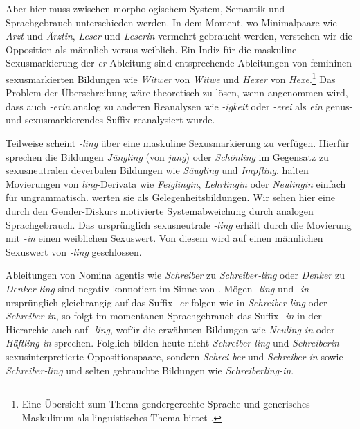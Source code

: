 Aber hier muss zwischen morphologischem System, Semantik und Sprachgebrauch unterschieden werden. In dem Moment, wo Minimalpaare wie \textit{Arzt} und \textit{Ärztin}, \textit{Leser} und \textit{Leserin} vermehrt gebraucht werden, verstehen wir die Opposition als männlich versus weiblich. Ein Indiz für die maskuline Sexusmarkierung der \textit{er}-Ableitung sind entsprechende Ableitungen von femininen sexusmarkierten Bildungen wie \textit{Witwer} von \textit{Witwe} und \textit{Hexer} von \textit{Hexe}.\footnote{Eine Übersicht zum Thema gendergerechte Sprache und generisches Maskulinum als linguistisches Thema bietet \citet{Diewald2018}.} Das Problem der Überschreibung wäre theoretisch zu lösen, wenn angenommen wird, dass auch \textit{-erin} analog zu anderen Reanalysen wie \textit{-igkeit} oder \textit{-erei} als \textit{ein} genus- und sexusmarkierendes Suffix reanalysiert wurde.

Teilweise scheint \textit{-ling} über eine maskuline Sexusmarkierung zu verfügen. Hierfür sprechen \zB die Bildungen \textit{Jüngling} (von \textit{jung}) oder \textit{Schönling} im Gegensatz zu sexusneutralen deverbalen Bildungen wie \textit{Säugling} und \textit{Impfling}. \citet[145, 152]{EisenbergSayatz2002} halten Movierungen von \textit{ling}-Derivata wie \textit{Feiglingin}, \textit{Lehrlingin} oder \textit{Neulingin} einfach für ungrammatisch. \citet[237]{FleischerBarz2012} werten sie als Gelegenheitsbildungen. Wir sehen hier eine durch den Gender-Diskurs motivierte Systemabweichung durch analogen Sprachgebrauch. Das ursprünglich sexusneutrale \textit{-ling} erhält durch die Movierung mit \textit{-in} einen weiblichen Sexuswert. Von diesem wird auf einen männlichen Sexuswert von \textit{-ling} geschlossen.

Ableitungen von Nomina agentis wie \textit{Schreiber} zu \textit{Schreiber-ling} oder \textit{Denker} zu \textit{Denker-ling} sind negativ konnotiert im Sinne von . Mögen \textit{-ling} und \textit{-in} ursprünglich gleichrangig auf das Suffix \textit{-er} folgen wie in \textit{Schreiber-ling} oder \textit{Schreiber-in}, so folgt im momentanen Sprachgebrauch das Suffix \textit{-in} in der Hierarchie auch auf \textit{-ling}, wofür die erwähnten Bildungen wie \textit{Neuling-in} oder \textit{Häftling-in} sprechen. Folglich bilden heute nicht \textit{Schreiber-ling} und \textit{Schreiberin} sexusinterpretierte Oppositionspaare, sondern \textit{Schrei-ber} und \textit{Schreiber-in} sowie \textit{Schreiber-ling} und selten gebrauchte Bildungen wie \textit{Schreiberling-in}.


